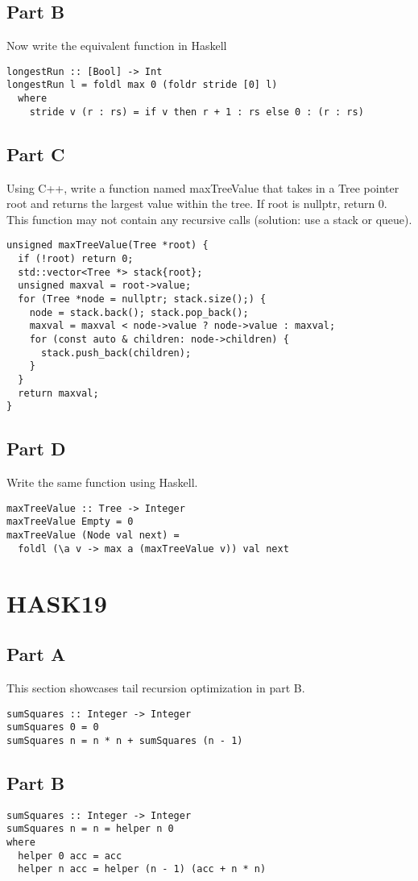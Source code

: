 \subsection*{Part B}
Now write the equivalent function in Haskell
\begin{verbatim}
longestRun :: [Bool] -> Int
longestRun l = foldl max 0 (foldr stride [0] l)
  where
    stride v (r : rs) = if v then r + 1 : rs else 0 : (r : rs)
\end{verbatim}

\subsection*{Part C}
Using C++, write a function named maxTreeValue that takes in a Tree
pointer root and returns the largest value within the tree. If root is
nullptr, return 0. This function may not contain any recursive calls
(solution: use a stack or queue).
\begin{verbatim}
unsigned maxTreeValue(Tree *root) {
  if (!root) return 0;
  std::vector<Tree *> stack{root};
  unsigned maxval = root->value;
  for (Tree *node = nullptr; stack.size();) {
    node = stack.back(); stack.pop_back();
    maxval = maxval < node->value ? node->value : maxval;
    for (const auto & children: node->children) {
      stack.push_back(children);
    }
  }
  return maxval;
}
\end{verbatim}

\subsection*{Part D}
Write the same function using Haskell.
\begin{verbatim}
maxTreeValue :: Tree -> Integer
maxTreeValue Empty = 0
maxTreeValue (Node val next) =
  foldl (\a v -> max a (maxTreeValue v)) val next
\end{verbatim}

\section*{HASK19}
\subsection*{Part A}
This section showcases tail recursion optimization in part B.
\begin{verbatim}
sumSquares :: Integer -> Integer
sumSquares 0 = 0
sumSquares n = n * n + sumSquares (n - 1)
\end{verbatim}

\subsection*{Part B}
\begin{verbatim}
sumSquares :: Integer -> Integer
sumSquares n = n = helper n 0
where
  helper 0 acc = acc
  helper n acc = helper (n - 1) (acc + n * n)
\end{verbatim}